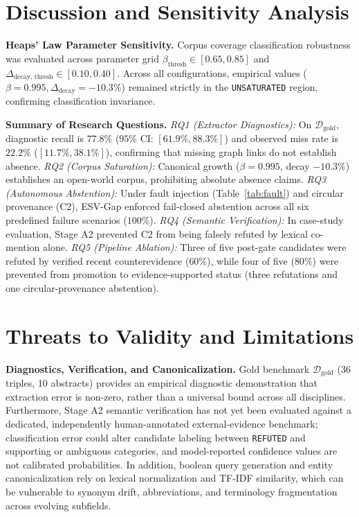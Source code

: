 \documentclass[runningheads]{llncs}
\newcommand{\method}{ESV-Gap}
\begin{document}
\section{Discussion and Sensitivity Analysis}
\label{sec:discussion}

\noindent\textbf{Heaps' Law Parameter Sensitivity.} Corpus coverage classification robustness was evaluated across parameter grid $\beta_{\text{thresh}} \in [0.65, 0.85]$ and $\Delta_{\text{decay, thresh}} \in [0.10, 0.40]$. Across all configurations, empirical values ($\beta = 0.995, \Delta_{\text{decay}} = -10.3\%$) remained strictly in the \texttt{UNSATURATED} region, confirming classification invariance.

\noindent\textbf{Summary of Research Questions.} \emph{RQ1 (Extractor Diagnostics):} On $\mathcal{D}_{\text{gold}}$, diagnostic recall is $77.8\%$ ($95\%$ CI: $[61.9\%, 88.3\%]$) and observed miss rate is $22.2\%$ ($[11.7\%, 38.1\%]$), confirming that missing graph links do not establish absence. \emph{RQ2 (Corpus Saturation):} Canonical growth ($\beta = 0.995$, decay $-10.3\%$) establishes an open-world corpus, prohibiting absolute absence claims. \emph{RQ3 (Autonomous Abstention):} Under fault injection (Table~\ref{tab:fault}) and circular provenance (C2), \method{} enforced fail-closed abstention across all six predefined failure scenarios ($100\%$). \emph{RQ4 (Semantic Verification):} In case-study evaluation, Stage A2 prevented C2 from being falsely refuted by lexical co-mention alone. \emph{RQ5 (Pipeline Ablation):} Three of five post-gate candidates were refuted by verified recent counterevidence ($60\%$), while four of five ($80\%$) were prevented from promotion to evidence-supported status (three refutations and one circular-provenance abstention).

\section{Threats to Validity and Limitations}
\label{sec:threats}

\noindent\textbf{Diagnostics, Verification, and Canonicalization.} Gold benchmark $\mathcal{D}_{\text{gold}}$ (36 triples, 10 abstracts) provides an empirical diagnostic demonstration that extraction error is non-zero, rather than a universal bound across all disciplines. Furthermore, Stage A2 semantic verification has not yet been evaluated against a dedicated, independently human-annotated external-evidence benchmark; classification error could alter candidate labeling between \texttt{REFUTED} and supporting or ambiguous categories, and model-reported confidence values are not calibrated probabilities. In addition, boolean query generation and entity canonicalization rely on lexical normalization and TF-IDF similarity, which can be vulnerable to synonym drift, abbreviations, and terminology fragmentation across evolving subfields.
\end{document}
